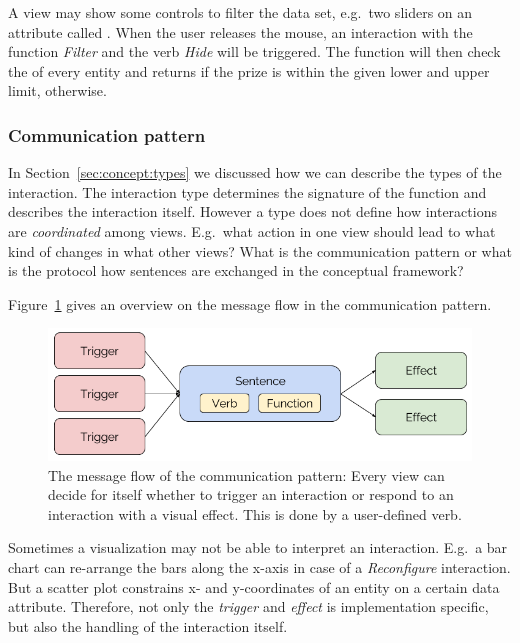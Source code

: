 A view may show some controls to filter the data set, e.g.\ two sliders on an attribute called .
When the user releases the mouse, an interaction with the function \emph{Filter} and the verb \emph{Hide} will be triggered.  
The function will then check the  of every entity and returns  if the prize is within the given lower and upper limit,  otherwise.

\subsubsection{Communication pattern}

In Section~\ref{sec:concept:types} we discussed how we can describe the types of the interaction.
The interaction type determines the signature of the function and describes the interaction itself.
However a type does not define how interactions are \emph{coordinated} among views.
E.g.\ what action in one view should lead to what kind of changes in what other views?
What is the communication pattern or what is the protocol how sentences are exchanged in the conceptual framework?

Figure~\ref{fig:concept:communication-pattern} gives an overview on the message flow in the communication pattern.
\begin{figure}[h!]
  \centering
  \includegraphics[width=\textwidth]{images/concept/communication-pattern.png}
  \caption{%
    The message flow of the communication pattern:
    Every view can decide for itself whether to trigger an interaction or respond to an interaction with a visual effect.
    This is done by a user-defined verb.
  }\label{fig:concept:communication-pattern}
\end{figure}

Sometimes a visualization may not be able to interpret an interaction.
E.g.\ a bar chart can re-arrange the bars along the x-axis in case of a \emph{Reconfigure} interaction.
But a scatter plot constrains x- and y-coordinates of an entity on a certain data attribute.
Therefore, not only the \emph{trigger} and \emph{effect} is implementation specific, but also the handling of the interaction itself.

